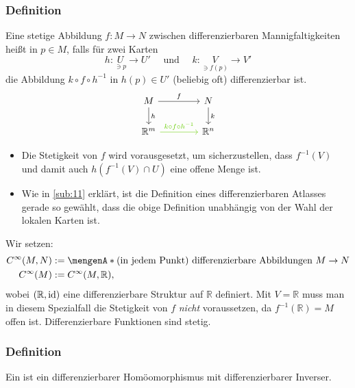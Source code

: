 \subsubsection[Definition: Differenzierbarkeit auf einer Mannigfaltigkeit]{Definition} %
\label{ssub:141}
Eine stetige Abbildung $f : M  \to N$ zwischen differenzierbaren Mannigfaltigkeiten heißt  in 
$p \in M$, falls  für zwei Karten 
\[
	h : \underset{\ni p}{U} \to U' \quad  \text{ und } \quad k : \underset{\ni f(p)}{V }\to V'
\]
die Abbildung $k \circ f \circ h ^{-1}$ in $h(p) \in U'$ (beliebig oft) differenzierbar ist.
\[
	\begin{tikzcd}[column sep=4em]
		M \rar{f} \dar{h}& N \dar{k}\\
		\mathds{R}^m \rar[Chartreuse3]{k \circ f \circ h ^{-1}}& \mathds{R}^n
	\end{tikzcd}
\]
\begin{itemize}
	\item Die Stetigkeit von $f$ wird vorausgesetzt, um sicherzustellen, dass $f ^{-1}(V)$ und damit auch $h(f ^{-1}(V) \cap U)$ eine offene Menge ist.
	\item Wie in \ref{sub:11} erklärt, ist die Definition eines differenzierbaren Atlasses gerade so gewählt, dass die obige Definition unabhängig von der Wahl der lokalen
	Karten ist.
\end{itemize}
Wir setzen:
\begin{align*}
	C^\infty(M,N) &:= \set{\text{(in jedem Punkt) differenzierbare Abbildungen } M  \to N}  \\
	C^\infty(M) &:= C^\infty(M,\mathds{R}),
\end{align*}
wobei $(\mathbb{R}, \operatorname{id})$ eine differenzierbare Struktur auf $\mathds{R}$ definiert. Mit $V=\mathds{R}$ muss man in diesem Spezialfall die Stetigkeit von $f$ \emph{nicht}
voraussetzen, da $f ^{-1}(\mathds{R}) = M$ offen ist. Differenzierbare Funktionen sind stetig.

\subsubsection[Definition: Diffeomorphismus]{Definition} %
\label{ssub:142}
Ein  ist ein differenzierbarer Homöomorphismus mit differenzierbarer Inverser.

